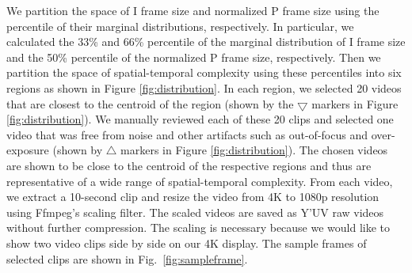 \documentclass{sig-alternate}
\begin{document}
We partition the space of I frame size and normalized P frame size using the percentile of their marginal distributions, respectively. In particular, we calculated the 33\% and 66\% percentile of the marginal distribution of I frame size and the 50\% percentile of the normalized P frame size, respectively. Then we partition the space of spatial-temporal complexity using these percentiles into six regions as shown in Figure \ref{fig:distribution}. In each region, we selected 20 videos that are closest to the centroid of the region (shown by the $\bigtriangledown$ markers in Figure \ref{fig:distribution}). We manually reviewed each of these 20 clips and selected one video that was free from noise and other artifacts such as out-of-focus and over-exposure (shown by $\triangle$ markers in Figure \ref{fig:distribution}). The chosen videos are shown to be close to the centroid of the respective regions and thus are representative of a wide range of spatial-temporal complexity. From each video, we extract a 10-second clip and resize the video from 4K to 1080p resolution using Ffmpeg's scaling filter. The scaled videos are saved as Y'UV raw videos without further compression. The scaling is necessary because we would like to show two video clips side by side on our 4K display. The sample frames of selected clips are shown in Fig.~\ref{fig:sampleframe}.
\end{document}
